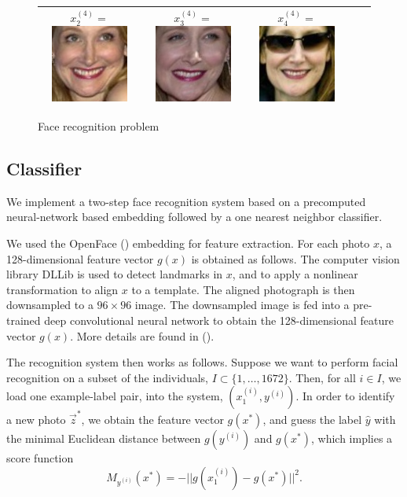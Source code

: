 \documentclass[twoside,11pt]{article}
\begin{document}
\begin{figure}
\begin{tabular}{|c|ccc|c|}
  $x_2^{(4)} = $\includegraphics[scale = 0.2]{face_photos/Patricia_Clarkson_0002.png} &  
  $x_3^{(4)} = $\includegraphics[scale = 0.2]{face_photos/Patricia_Clarkson_0003.png} &  
  $x_4^{(4)} = $\includegraphics[scale = 0.2]{face_photos/Patricia_Clarkson_0004.png} \\ \hline
\end{tabular}
\caption{Face recognition problem}
\label{fig:face_rec}
\end{figure}

\subsection{Classifier}
We implement a two-step face recognition system based on a precomputed neural-network based embedding followed by a one nearest neighbor classifier.

We used the OpenFace  (\cite{amos2016openface}) embedding for feature extraction.  For each photo $x$, a 128-dimensional feature vector $g(x)$ is
obtained as follows.
The computer vision library DLLib is used to detect landmarks in $x$, and to apply a nonlinear transformation to align
 $x$ to a template.
The aligned photograph is then downsampled to a $96 \times 96$ image. The downsampled image is fed into a pre-trained deep convolutional neural network to  obtain the 128-dimensional feature vector $g(x)$. More details are found in (\cite{amos2016openface}).

The recognition system then works as follows.  Suppose we want to
perform facial recognition on a subset of the individuals, $I \subset
\{1,\hdots, 1672\}$.  Then, for all $i \in I$, we load one example-label pair, into the system, $(x_1^{(i)}, y^{(i)})$.  In
order to identify a new photo $\vec{z}^*$, we obtain the feature
vector $g(x^*)$, and guess the label $\hat{y}$
with the minimal Euclidean distance between $g(y^{(i)})$ and $g(x^*)$,
which implies a score function
\[
M_{y^{(i)}}(x^*) = -||g(x_1^{(i)}) - g(x^*)||^2.
\]
\end{document}
